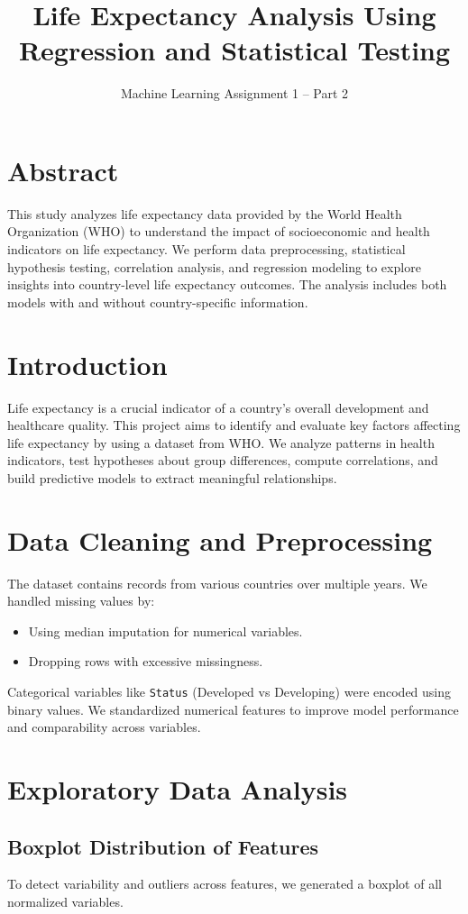 \documentclass[11pt]{article}
\title{\textbf{Life Expectancy Analysis Using Regression and Statistical Testing}}
\author{Machine Learning Assignment 1 – Part 2}
\date{}
\begin{document}
\maketitle

\section*{Abstract}
This study analyzes life expectancy data provided by the World Health Organization (WHO) to understand the impact of socioeconomic and health indicators on life expectancy. We perform data preprocessing, statistical hypothesis testing, correlation analysis, and regression modeling to explore insights into country-level life expectancy outcomes. The analysis includes both models with and without country-specific information.

\section{Introduction}
Life expectancy is a crucial indicator of a country's overall development and healthcare quality. This project aims to identify and evaluate key factors affecting life expectancy by using a dataset from WHO. We analyze patterns in health indicators, test hypotheses about group differences, compute correlations, and build predictive models to extract meaningful relationships.

\section{Data Cleaning and Preprocessing}
The dataset contains records from various countries over multiple years. We handled missing values by:
\begin{itemize}
    \item Using median imputation for numerical variables.
    \item Dropping rows with excessive missingness.
\end{itemize}

Categorical variables like \texttt{Status} (Developed vs Developing) were encoded using binary values. We standardized numerical features to improve model performance and comparability across variables.

\section{Exploratory Data Analysis}

\subsection{Boxplot Distribution of Features}
To detect variability and outliers across features, we generated a boxplot of all normalized variables.
\end{document}
